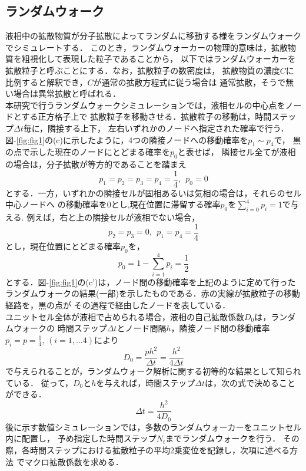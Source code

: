 \subsection{ランダムウォーク}
液相中の拡散物質が分子拡散によってランダムに移動する様をランダムウォークでシミュレートする．
このとき，ランダムウォーカーの物理的意味は，拡散物質を粗視化して表現した粒子であることから，
以下ではランダムウォーカーを拡散粒子と呼ぶことにする．なお，拡散粒子の数密度は，
拡散物質の濃度$C$に比例すると解釈でき，$C$が通常の拡散方程式に従う場合は
通常拡散，そうで無い場合は異常拡散と呼ばれる．\\
\hspace{\parindent}
本研究で行うランダムウォークシミュレーションでは，液相セルの中心点をノードとする正方格子上で
拡散粒子を移動させる．拡散粒子の移動は，時間ステップ$\Delta t$毎に，隣接する上下，
左右いずれかのノードへ指定された確率で行う．
図-\ref{fig:fig1}の(c)に示したように，4つの隣接ノードへの移動確率を$p_1\sim p_4$で，
黒の点で示した現在のノードにとどまる確率を$p_0$と表せば，
隣接セル全てが液相の場合は，分子拡散が等方的であることを踏まえ
\begin{equation}
	p_1=p_2=p_3=p_4=\frac{1}{4}, \ \ p_0=0
	\label{eqn:iso_p}
\end{equation}
とする．一方，いずれかの隣接セルが固相あるいは気相の場合は，それらのセル中心ノードへ
の移動確率を0とし,現在位置に滞留する確率$p_0$を$\sum_{i=0}^4p_i=1$で与える.
例えば，右と上の隣接セルが液相でない場合，
\begin{equation}
	p_2=p_3=0, \ \ p_1=p_4=\frac{1}{4}
\end{equation}
とし，現在位置にとどまる確率$p_0$を，
\begin{equation}
	p_0=1-\sum_{i=1}^4 p_i=\frac{1}{2}
\end{equation}
とする．図-\ref{fig:fig1}の(c')は，ノード間の移動確率を上記のように定めて行った
ランダムウォークの結果(一部)を示したものである．赤の実線が拡散粒子の移動経路を，黒の点が
その過程で経由したノードを表している．\\
ユニットセル全体が液相で占められる場合，液相の自己拡散係数$D_0$は，ランダムウォークの
時間ステップ$\Delta t$とノード間隔$h$，隣接ノード間の移動確率$p_i=p=\frac{1}{4},\,
(i=1,\dots 4)$により
\begin{equation}
	D_0=\frac{ph^2}{\Delta t}=\frac{h^2}{4\Delta t}
	\label{eqn:D0}
\end{equation}
で与えられることが，ランダムウォーク解析に関する初等的な結果として知られている\cite{Toda}．
従って，$D_0$と$h$を与えれば，時間ステップ$\Delta t$は，次の式で決めることができる．
\begin{equation}
	\Delta t=\frac{h^2}{4D_0}
	\label{eqn:dt}
\end{equation}
後に示す数値シミュレーションでは，多数のランダムウォーカーをユニットセル内に配置し，
予め指定した時間ステップ$N_t$までランダムウォークを行う．
その際，各時間ステップにおける拡散粒子の平均2乗変位を記録し，次項に述べる方法
でマクロ拡散係数を求める．
